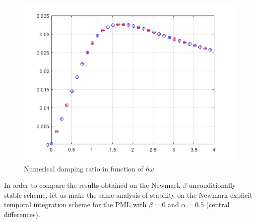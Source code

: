\begin{figure}[H]
    \centering
    \includegraphics[scale=0.6]{images/Numerical_damping_ratio.png}
    \caption{Numerical damping ratio in function of $h\omega$}
    \label{fig:num_damp_ratio}
\end{figure}
In order to compare the results obtained on the Newmark-$\beta$ unconditionally stable scheme, let us make the same analysis of stability on the Newmark explicit temporal integration scheme for the PML with $\beta=0$ and $\alpha=0.5$ (central differences). 
